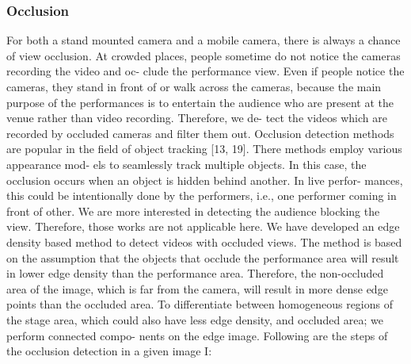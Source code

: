 \documentclass{sig-alternate}
\begin{document}
\subsubsection{Occlusion}
For both a stand mounted camera and a mobile camera, there
is always a chance of view occlusion. At crowded places, people
sometime do not notice the cameras recording the video and oc-
clude the performance view. Even if people notice the cameras,
they stand in front of or walk across the cameras, because the main
purpose of the performances is to entertain the audience who are
present at the venue rather than video recording. Therefore, we de-
tect the videos which are recorded by occluded cameras and filter
them out.
Occlusion detection methods are popular in the field of object
tracking [13, 19]. There methods employ various appearance mod-
els to seamlessly track multiple objects. In this case, the occlusion
occurs when an object is hidden behind another. In live perfor-
mances, this could be intentionally done by the performers, i.e.,
one performer coming in front of other. We are more interested in
detecting the audience blocking the view. Therefore, those works
are not applicable here.
We have developed an edge density based method to detect videos
with occluded views. The method is based on the assumption that
the objects that occlude the performance area will result in lower
edge density than the performance area. Therefore, the non-occluded
area of the image, which is far from the camera, will result in more
dense edge points than the occluded area. To differentiate between
homogeneous regions of the stage area, which could also have less edge density, and occluded area; we perform connected compo-
nents on the edge image. Following are the steps of the occlusion
detection in a given image I:
\end{document}
